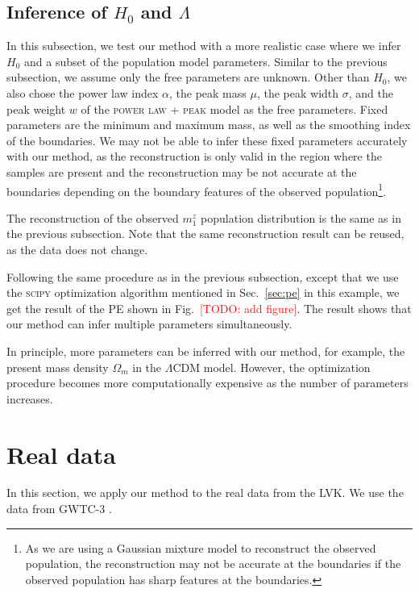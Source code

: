 \documentclass[twocolumn]{aastex631}
\newcommand{\todo}[1]{\textcolor{red}{[TODO: #1]}}
\begin{document}
\subsection{Inference of $H_0$ and $\Lambda$}
\label{sec:inference_multi}

In this subsection, we test our method with a more realistic case where we infer $H_0$ and a subset of the population model parameters.
Similar to the previous subsection, we assume only the free parameters are unknown.
Other than $H_0$, we also chose the power law index $\alpha$, the peak mass $\mu$, the peak width $\sigma$, and the peak weight $w$ of the \textsc{power law + peak} model as the free parameters.
Fixed parameters are the minimum and maximum mass, as well as the smoothing index of the boundaries.
We may not be able to infer these fixed parameters accurately with our method, as the reconstruction is only valid in the region where the samples are present and the reconstruction may be not accurate at the boundaries depending on the boundary features of the observed population\footnote{As we are using a Gaussian mixture model to reconstruct the observed population, the reconstruction may not be accurate at the boundaries if the observed population has sharp features at the boundaries.}.

The reconstruction of the observed $m^z_1$ population distribution is the same as in the previous subsection.
Note that the same reconstruction result can be reused, as the data does not change.

Following the same procedure as in the previous subsection, except that we use the \textsc{scipy} optimization algorithm mentioned in Sec.~\ref{sec:pe} in this example, we get the result of the \ac{PE} shown in Fig.~\todo{add figure}.
The result shows that our method can infer multiple parameters simultaneously.

In principle, more parameters can be inferred with our method, for example, the present mass density $\Omega_m$ in the $\Lambda$CDM model.
However, the optimization procedure becomes more computationally expensive as the number of parameters increases.

\section{Real data}
\label{sec:real_data}

In this section, we apply our method to the real data from the \ac{LVK}.
We use the data from \ac{GWTC-3} \citep{LIGOScientific:2019lzm, KAGRA:2023pio}.
\end{document}
